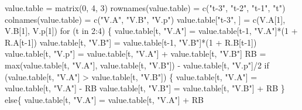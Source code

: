 \documentclass[
  letterpaper,
  DIV=11,
  numbers=noendperiod]{scrreprt}
\newenvironment{Shaded}{\begin{snugshade}}{\end{snugshade}}
\newcommand{\ControlFlowTok}[1]{\textcolor[rgb]{0.00,0.23,0.31}{#1}}
\newcommand{\DecValTok}[1]{\textcolor[rgb]{0.68,0.00,0.00}{#1}}
\newcommand{\FunctionTok}[1]{\textcolor[rgb]{0.28,0.35,0.67}{#1}}
\newcommand{\NormalTok}[1]{\textcolor[rgb]{0.00,0.23,0.31}{#1}}
\newcommand{\OtherTok}[1]{\textcolor[rgb]{0.00,0.23,0.31}{#1}}
\newcommand{\SpecialCharTok}[1]{\textcolor[rgb]{0.37,0.37,0.37}{#1}}
\newcommand{\StringTok}[1]{\textcolor[rgb]{0.13,0.47,0.30}{#1}}
\theoremstyle{definition}
\theoremstyle{definition}
\theoremstyle{remark}
\begin{document}
\begin{Shaded}
\begin{Highlighting}[]
\NormalTok{value.table }\OtherTok{=} \FunctionTok{matrix}\NormalTok{(}\DecValTok{0}\NormalTok{, }\DecValTok{4}\NormalTok{, }\DecValTok{3}\NormalTok{)}
\FunctionTok{rownames}\NormalTok{(value.table) }\OtherTok{=} \FunctionTok{c}\NormalTok{(}\StringTok{"t{-}3"}\NormalTok{, }\StringTok{"t{-}2"}\NormalTok{, }\StringTok{"t{-}1"}\NormalTok{, }\StringTok{"t"}\NormalTok{)}
\FunctionTok{colnames}\NormalTok{(value.table) }\OtherTok{=} \FunctionTok{c}\NormalTok{(}\StringTok{"V.A"}\NormalTok{, }\StringTok{"V.B"}\NormalTok{, }\StringTok{"V.p"}\NormalTok{)}
\NormalTok{value.table[}\StringTok{"t{-}3"}\NormalTok{, ] }\OtherTok{=} \FunctionTok{c}\NormalTok{(V.A[}\DecValTok{1}\NormalTok{], V.B[}\DecValTok{1}\NormalTok{], V.p[}\DecValTok{1}\NormalTok{])}
\ControlFlowTok{for}\NormalTok{ (t }\ControlFlowTok{in} \DecValTok{2}\SpecialCharTok{:}\DecValTok{4}\NormalTok{) \{}
\NormalTok{  value.table[t, }\StringTok{"V.A"}\NormalTok{] }\OtherTok{=}\NormalTok{ value.table[t}\DecValTok{{-}1}\NormalTok{, }\StringTok{"V.A"}\NormalTok{]}\SpecialCharTok{*}\NormalTok{(}\DecValTok{1} \SpecialCharTok{+}\NormalTok{ R.A[t}\DecValTok{{-}1}\NormalTok{])}
\NormalTok{  value.table[t, }\StringTok{"V.B"}\NormalTok{] }\OtherTok{=}\NormalTok{ value.table[t}\DecValTok{{-}1}\NormalTok{, }\StringTok{"V.B"}\NormalTok{]}\SpecialCharTok{*}\NormalTok{(}\DecValTok{1} \SpecialCharTok{+}\NormalTok{ R.B[t}\DecValTok{{-}1}\NormalTok{])}
\NormalTok{  value.table[t, }\StringTok{"V.p"}\NormalTok{] }\OtherTok{=}\NormalTok{ value.table[t, }\StringTok{"V.A"}\NormalTok{] }\SpecialCharTok{+}\NormalTok{ value.table[t, }\StringTok{"V.B"}\NormalTok{]}
\NormalTok{  RB }\OtherTok{=} \FunctionTok{max}\NormalTok{(value.table[t, }\StringTok{"V.A"}\NormalTok{], value.table[t, }\StringTok{"V.B"}\NormalTok{]) }\SpecialCharTok{{-}}\NormalTok{ value.table[t, }\StringTok{"V.p"}\NormalTok{]}\SpecialCharTok{/}\DecValTok{2}
  \ControlFlowTok{if}\NormalTok{ (value.table[t, }\StringTok{"V.A"}\NormalTok{] }\SpecialCharTok{\textgreater{}}\NormalTok{ value.table[t, }\StringTok{"V.B"}\NormalTok{]) \{}
\NormalTok{    value.table[t, }\StringTok{"V.A"}\NormalTok{] }\OtherTok{=}\NormalTok{ value.table[t, }\StringTok{"V.A"}\NormalTok{] }\SpecialCharTok{{-}}\NormalTok{ RB}
\NormalTok{    value.table[t, }\StringTok{"V.B"}\NormalTok{] }\OtherTok{=}\NormalTok{ value.table[t, }\StringTok{"V.B"}\NormalTok{] }\SpecialCharTok{+}\NormalTok{ RB}
\NormalTok{    \}}
  \ControlFlowTok{else}\NormalTok{\{}
\NormalTok{    value.table[t, }\StringTok{"V.A"}\NormalTok{] }\OtherTok{=}\NormalTok{ value.table[t, }\StringTok{"V.A"}\NormalTok{] }\SpecialCharTok{+}\NormalTok{ RB}

\end{Highlighting}
\end{Shaded}
\end{document}
